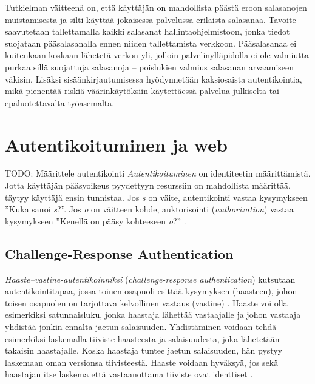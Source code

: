 \documentclass[english,gradu]{tktltiki}
\begin{document}
Tutkielman väitteenä on, että käyttäjän on mahdollista päästä eroon salasanojen muistamisesta ja silti käyttää jokaisessa palvelussa erilaista salasanaa. Tavoite saavutetaan tallettamalla kaikki salasanat hallintaohjelmistoon, jonka tiedot suojataan pääsalasanalla ennen niiden tallettamista verkkoon. Pääsalasanaa ei kuitenkaan koskaan lähetetä verkon yli, jolloin palvelinylläpidolla ei ole valmiutta purkaa sillä suojattuja salasanoja -- poislukien valmius salasanan arvaamiseen väkisin. Lisäksi sisäänkirjautumisessa hyödynnetään kaksiosaista autentikointia, mikä pienentää riskiä väärinkäytöksiin käytettäessä palvelua julkiselta tai epäluotettavalta työasemalta.




\section{Autentikoituminen ja web} %
\label{sec:autentikoituminen_ja_web}

TODO: Määrittele autentikointi
\emph{Autentikoituminen} on identiteetin määrittämistä.
Jotta käyttäjän pääsyoikeus pyydettyyn resurssiin on mahdollista määrittää, täytyy käyttäjä ensin tunnistaa.
Jos \emph{s} on väite, autentikointi vastaa kysymykseen ''Kuka sanoi \emph{s}?''.
Jos \emph{o} on väitteen kohde, auktorisointi (\emph{authorization}) vastaa kysymykseen ''Kenellä on pääsy kohteeseen \emph{o}?'' \cite{lampson_distributed_1992}.




\subsection{Challenge-Response Authentication} %
\label{sub:challenge_response_authentication}

\emph{Haaste--vastine-autentikoinniksi} (\emph{challenge-response authentication}) kutsutaan autentikointitapaa, jossa toinen osapuoli esittää kysymyksen (haasteen), johon toisen osapuolen on tarjottava kelvollinen vastaus (vastine) \cite{NIST_SP800-63}. Haaste voi olla esimerkiksi satunnaisluku, jonka haastaja lähettää vastaajalle ja johon vastaaja yhdistää jonkin ennalta jaetun salaisuuden. Yhdistäminen voidaan tehdä esimerkiksi laskemalla tiiviste haasteesta ja salaisuudesta, joka lähetetään takaisin haastajalle. Koska haastaja tuntee jaetun salaisuuden, hän pystyy laskemaan oman versionsa tiivisteestä. Haaste voidaan hyväksyä, jos sekä haastajan itse laskema että vastaanottama tiiviste ovat identtiset \cite{NIST_SP800-63}.
\end{document}
